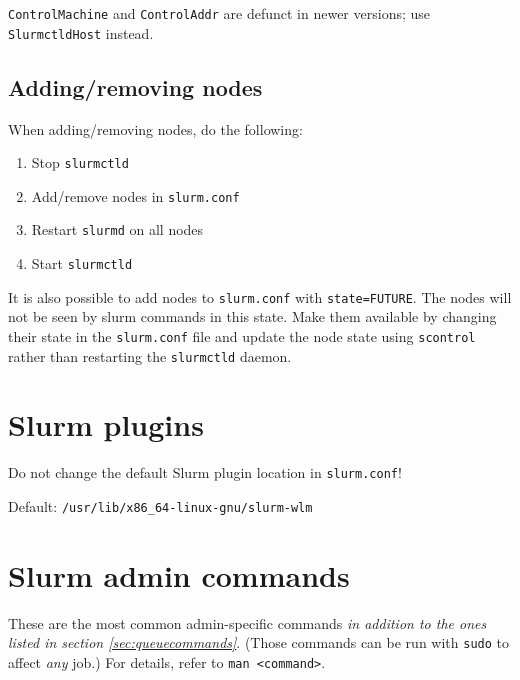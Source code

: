 \texttt{ControlMachine} and \texttt{ControlAddr} are defunct in newer versions; use \texttt{SlurmctldHost} instead.

\subsection{Adding/removing nodes} \label{subsec:addnodes}

When adding/removing nodes, do the following:
\begin{enumerate}
\item Stop \texttt{slurmctld}
\item Add/remove nodes in \texttt{slurm.conf}
\item Restart \texttt{slurmd} on all nodes
\item Start \texttt{slurmctld}
\end{enumerate}

\noindent It is also possible to add nodes to \texttt{slurm.conf} with \texttt{state=FUTURE}. The nodes will not be seen by slurm commands in this state. Make them available by changing their state in the \texttt{slurm.conf} file and update the node state using \texttt{scontrol} rather than restarting the \texttt{slurmctld} daemon.

\section{Slurm plugins} \label{sec:slurmplugins}

Do not change the default Slurm plugin location in \texttt{slurm.conf}!

Default: \texttt{/usr/lib/x86\_64-linux-gnu/slurm-wlm}

\section{Slurm admin commands} \label{sec:slurmadmin}
These are the most common admin-specific commands \emph{in addition to the ones listed in section \ref{sec:queuecommands}}. (Those commands can be run with \texttt{sudo} to affect \emph{any} job.) For details, refer to \texttt{man <command>}.

